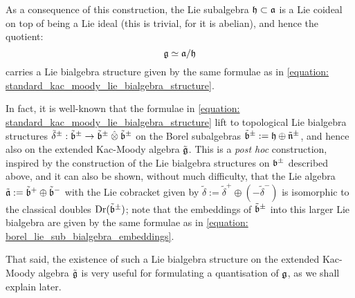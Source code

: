         As a consequence of this construction, the Lie subalgebra $\mathfrak{h} \subset \mathfrak{a}$ is a Lie coideal on top of being a Lie ideal (this is trivial, for it is abelian), and hence the quotient:
            $$\mathfrak{g} \simeq \mathfrak{a}/\mathfrak{h}$$
        carries a Lie bialgebra structure given by the same formulae as in \eqref{equation: standard_kac_moody_lie_bialgebra_structure}.
        \begin{remark}
            In fact, it is well-known that the formulae in \eqref{equation: standard_kac_moody_lie_bialgebra_structure} lift to topological Lie bialgebra structures $\tilde{\delta}^{\pm}: \tilde{\b}^{\pm} \to \tilde{\b}^{\pm} \hattensor \tilde{\b}^{\pm}$ on the Borel subalgebras $\tilde{\mathfrak{b}}^{\pm} := \mathfrak{h} \oplus \tilde{\mathfrak{n}}^{\pm}$, and hence also on the extended Kac-Moody algebra $\tilde{\mathfrak{g}}$. This is a \textit{post hoc} construction, inspired by the construction of the Lie bialgebra structures on $\mathfrak{b}^{\pm}$ described above, and it can also be shown, without much difficulty, that the Lie algebra $\tilde{\mathfrak{a}} := \tilde{\mathfrak{b}}^+ \oplus \tilde{\mathfrak{b}}^-$ with the Lie cobracket given by $\tilde{\delta} := \tilde{\delta}^+ \oplus (-\tilde{\delta}^-)$ is isomorphic to the classical doubles $\operatorname{Dr}(\tilde{\mathfrak{b}}^{\pm})$; note that the embeddings of $\tilde{\mathfrak{b}}^{\pm}$ into this larger Lie bialgebra are given by the same formulae as in \eqref{equation: borel_lie_sub_bialgebra_embeddings}. 

            That said, the existence of such a Lie bialgebra structure on the extended Kac-Moody algebra $\tilde{\mathfrak{g}}$ is very useful for formulating a quantisation of $\mathfrak{g}$, as we shall explain later. 
        \end{remark}

